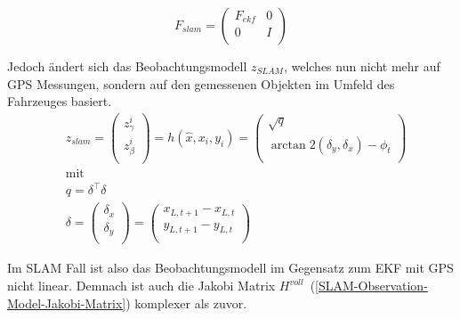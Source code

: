 \documentclass[11pt]{article}
\begin{document}
\begin{equation}\label{SLAM-Bewegungsmodell-Jakobi-Matrix}
	F_{slam} = \begin{pmatrix}
		F_{ekf} & 0 \\
		0 & I \\
	\end{pmatrix}
\end{equation}

Jedoch ändert sich das Beobachtungsmodell $z_{SLAM}$, welches nun nicht mehr auf GPS Messungen, sondern auf den gemessenen Objekten im Umfeld des Fahrzeuges basiert.
\begin{equation}\label{SLAM-Observation-Model}
\begin{split}
	&z_{slam} = \begin{pmatrix}
		z_\gamma^i \\
		z_\beta^i \\
	\end{pmatrix} = h(\hat{x}, x_i, y_i) = \begin{pmatrix}
		\sqrt{q} \\
		\arctan 2(\delta_y, \delta_x) - \phi_t \\
	\end{pmatrix}\\
	&\text{mit} \\
	&q = \delta^\intercal \delta \\
	&\delta = \begin{pmatrix}
		\delta_x \\
		\delta_y \\
	\end{pmatrix} = \begin{pmatrix}
		x_{L, t+1} - x_{L, t}  \\
		y_{L, t+1}  - y_{L, t} \\
	\end{pmatrix}
\end{split}
\end{equation}

Im SLAM Fall ist also das Beobachtungsmodell im Gegensatz zum EKF mit GPS nicht linear. Demnach ist auch die Jakobi Matrix $H^{voll}$~(\ref{SLAM-Observation-Model-Jakobi-Matrix}) komplexer als zuvor.
\end{document}
